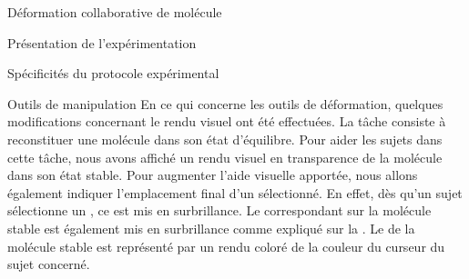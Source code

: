 \documentclass[myfrancais,ngerman,english,frenchb]{mythesis}
\begin{document}
\begin{mychapter}{Déformation collaborative de molécule}
\begin{mysection}{Présentation de l'expérimentation}
\begin{mysubsection}{Spécificités du protocole expérimental}
\begin{mysubsubsection}{Outils de manipulation}
					En ce qui concerne les outils de déformation, quelques modifications concernant le rendu visuel ont été effectuées.
					La tâche consiste à reconstituer une molécule dans son état d'équilibre.
					Pour aider les sujets dans cette tâche, nous avons affiché un rendu visuel en transparence de la molécule dans son état stable.
					Pour augmenter l'aide visuelle apportée, nous allons également indiquer l'emplacement final d'un  sélectionné.
					En effet, dès qu'un sujet sélectionne un \myglos{glo-Residu}, ce  est mis en surbrillance.
					Le  correspondant sur la molécule stable est également mis en surbrillance comme expliqué sur la .
					Le  de la molécule stable est représenté par un rendu \myCPK coloré de la couleur du curseur du sujet concerné.


\end{mysubsubsection}
\end{mysubsection}
\end{mysection}
\end{mychapter}
\end{document}
